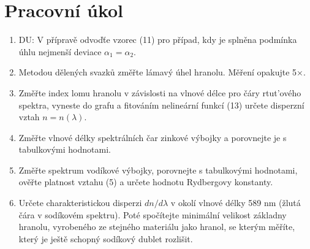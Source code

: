 \section{Pracovní úkol}
\begin{enumerate}
\item DU: V přípravě odvoďťe vzorec (11) pro případ, kdy je splněna podmínka úhlu
nejmenší deviace $\alpha_1 = \alpha_2$.
\item  Metodou dělených svazků změřte lámavý úhel hranolu. Měření opakujte 5×.
\item  Změřte index lomu hranolu v závislosti na vlnové délce pro čáry rtut’ového spektra, vyneste
do grafu a fitováním nelineární funkcí (13) určete disperzní vztah $n = n(\lambda)$.
\item  Změřte vlnové délky spektrálních čar zinkové výbojky a porovnejte je s tabulkovými hodnotami.
\item  Změřte spektrum vodíkové výbojky, porovnejte s tabulkovými hodnotami, ověřte platnost
vztahu (5) a určete hodnotu Rydbergovy konstanty.
\item  Určete charakteristickou disperzi $d n/d \lambda $
v okolí vlnové délky 589 nm (žlutá čára v sodíkovém
spektru). Poté spočítejte minimální velikost základny hranolu, vyrobeného ze stejného materiálu
jako hranol, se kterým měříte, který je ještě schopný sodíkový dublet rozlišit.
\end{enumerate}

